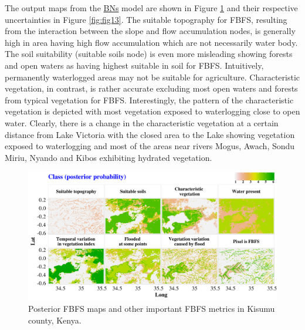 \documentclass[12pt,oneside]{article}
\begin{document}
The output maps from the \href{https://en.wikipedia.org/wiki/Bayesian_network}{BNs} model are shown in Figure \ref{fig:fig12} and their respective uncertainties in Figure \ref{fig:fig13}. The suitable topography for FBFS, resulting from the interaction between the slope and flow accumulation nodes, is generally high in area having high flow accumulation which are not necessarily water body. The soil suitability (suitable soils node) is even more misleading showing forests and open waters as having highest suitable in soil for FBFS. Intuitively, permanently waterlogged areas may not be suitable for agriculture. Characteristic vegetation, in contrast, is rather accurate excluding most open waters and forests from typical vegetation for FBFS. Interestingly, the pattern of the characteristic vegetation is depicted with most vegetation exposed to waterlogging close to open water. Clearly, there is a change in the characteristic vegetation at a certain distance from Lake Victoria with the closed area to the Lake showing vegetation exposed to waterlogging and most of the areas near rivers Mogus, Awach, Sondu Miriu, Nyando and Kibos exhibiting hydrated vegetation.

\begin{figure}[!htbp]

{\centering \includegraphics[width=1\linewidth,]{figures/Mapping_FBFS_posterior_maps} 

}

\caption{Posterior FBFS maps and other important FBFS metrics in Kisumu county, Kenya.}\label{fig:fig12}
\end{figure}
\end{document}
